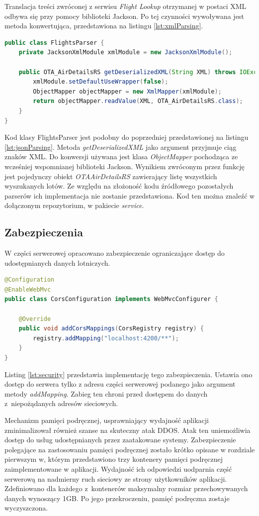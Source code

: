 \documentclass[12pt, twoside]{report}
\begin{document}
Translacja treści zwróconej z serwisu \textit{Flight Lookup} otrzymanej w postaci XML odbywa się przy pomocy biblioteki Jackson. Po tej czynności wywoływana jest metoda konwertująca, przedstawiona na listingu \ref{lst:xmlParsing}.
\begin{lstlisting}[language=java, caption=Implementacja parsowania treści XML, label=lst:xmlParsing]
public class FlightsParser {
    private JacksonXmlModule xmlModule = new JacksonXmlModule();

    public OTA_AirDetailsRS getDeserializedXML(String XML) throws IOException {
        xmlModule.setDefaultUseWrapper(false);
        ObjectMapper objectMapper = new XmlMapper(xmlModule);
        return objectMapper.readValue(XML, OTA_AirDetailsRS.class);
    }
}
\end{lstlisting}
Kod klasy FlightsParser jest podobny do poprzedniej przedstawionej na listingu \ref{lst:jsonParsing}. Metoda \textit{getDeserializedXML} jako argument przyjmuje ciąg znaków XML. Do konwersji używana jest klasa \textit{ObjectMapper} pochodząca ze wcześniej wspomnianej biblioteki Jackson. Wynikiem zwróconym przez funkcję jest pojedynczy obiekt \textit{OTAAirDetailsRS} zawierający listę wszystkich wyszukanych lotów.
Ze względu na złożoność kodu źródłowego pozostałych parserów ich implementacja nie zostanie przedstawiona. Kod ten można znaleźć w dołączonym repozytorium, w pakiecie \textit{service}.

\subsection{Zabezpieczenia}
W części serwerowej opracowano zabezpieczenie ograniczające dostęp do udostępnianych danych lotniczych.
\begin{lstlisting}[language=java, caption=Implementacja zabezpieczanie dostępu do serwera, label=lst:security]
@Configuration
@EnableWebMvc
public class CorsConfiguration implements WebMvcConfigurer {

    @Override
    public void addCorsMappings(CorsRegistry registry) {
        registry.addMapping("localhost:4200/**");
    }
}
\end{lstlisting}
Listing \ref{lst:security} przedstawia implementację tego zabezpieczenia. Ustawia ono dostęp do serwera tylko z adresu części serwerowej podanego jako argument metody \textit{addMapping}. Zabieg ten chroni przed dostępem do danych z~niepożądanych adresów sieciowych. 

Mechanizm pamięci podręcznej, usprawniający wydajność aplikacji zminimalizował również szanse na skuteczny atak DDOS. Atak ten uniemożliwia dostęp do usług udostępnianych przez zaatakowane systemy\cite{ddos}. Zabezpieczenie polegające na zastosowaniu pamięci podręcznej zostało krótko opisane w rozdziale pierwszym w, którym przedstawiono trzy kontenery pamięci podręcznej zaimplementowane w aplikacji. Wydajność ich odpowiedzi uodparnia część serwerową na nadmierny ruch sieciowy ze strony użytkowników aplikacji. Zdefiniowano dla każdego z~kontenerów maksymalny rozmiar przechowywanych danych wynoszący 1GB. Po jego przekroczeniu, pamięć podręczna zostaje wyczyszczona.
\end{document}
